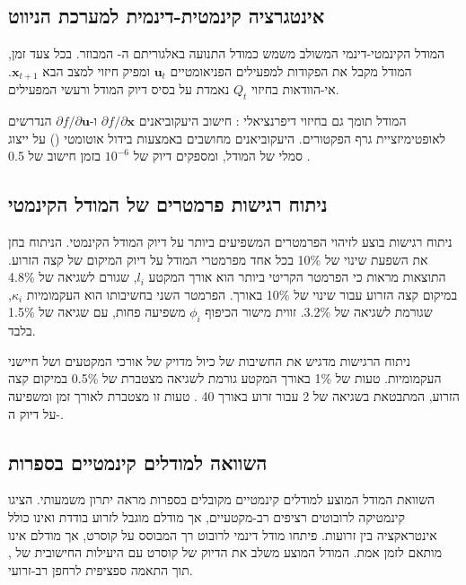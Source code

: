 \subsection{אינטגרציה קינמטית-דינמית למערכת הניווט}
\label{sec:kinematics_integration}

המודל הקינמטי-דינמי המשולב משמש כמודל התנועה באלגוריתם ה- המבוזר. בכל צעד זמן, המודל מקבל את הפקודות למפעילים הפניאומטיים $\mathbf{u}_t$ ומפיק חיזוי למצב הבא $\mathbf{x}_{t+1}$. אי-הוודאות בחיזוי $Q_t$ נאמדת על בסיס דיוק המודל ורעשי המפעילים.

המודל תומך גם בחיזוי דיפרנציאלי : חישוב היעקוביאנים $\partial f/\partial \mathbf{x}$ ו-$\partial f/\partial \mathbf{u}$ הנדרשים לאופטימיזציית גרף הפקטורים. היעקוביאנים מחושבים באמצעות בידול אוטומטי () על ייצוג סמלי של המודל, ומספקים דיוק של $10^{-6}$ בזמן חישוב של 0.5 .

\subsection{ניתוח רגישות פרמטרים של המודל הקינמטי}
\label{sec:kinematics_sensitivity}

ניתוח רגישות בוצע לזיהוי הפרמטרים המשפיעים ביותר על דיוק המודל הקינמטי. הניתוח בחן את השפעת שינוי של 10\% בכל אחד מפרמטרי המודל על דיוק המיקום של קצה הזרוע. התוצאות מראות כי הפרמטר הקריטי ביותר הוא אורך המקטע $l_i$, שגורם לשגיאה של 4.8\% במיקום קצה הזרוע עבור שינוי של 10\% באורך. הפרמטר השני בחשיבותו הוא העקמומיות $\kappa_i$, שגורמת לשגיאה של 3.2\%. זווית מישור הכיפוף $\phi_i$ משפיעה פחות, עם שגיאה של 1.5\% בלבד.

ניתוח הרגישות מדגיש את החשיבות של כיול מדויק של אורכי המקטעים ושל חיישני העקמומיות. טעות של 1\% באורך המקטע גורמת לשגיאה מצטברת של 0.5\% במיקום קצה הזרוע, המתבטאת בשגיאה של 2  עבור זרוע באורך 40 . טעות זו מצטברת לאורך זמן ומשפיעה על דיוק ה-.

\subsection{השוואה למודלים קינמטיים בספרות}
\label{sec:kinematics_comparison}

השוואת המודל המוצע למודלים קינמטיים מקובלים בספרות מראה יתרון משמעותי. \cite{Jones2006} הציגו קינמטיקה לרובוטים רציפים רב-מקטעיים, אך מודלם מוגבל לזרוע בודדת ואינו כולל אינטראקציה בין זרועות. \cite{Renda2018} פיתחו מודל דינמי לרובוט רך המבוסס על קוסרט, אך מודלם אינו מותאם לזמן אמת. המודל המוצע משלב את הדיוק של קוסרט עם היעילות החישובית של , תוך התאמה ספציפית לרחפן רב-זרועי.

